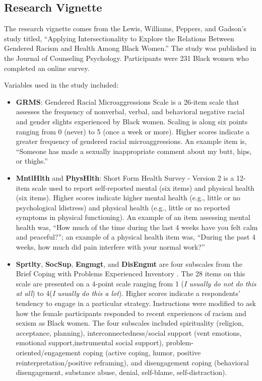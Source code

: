 \documentclass[
  11pt,
]{book}
\begin{document}
\hypertarget{research-vignette-5}{%
\subsection{Research Vignette}\label{research-vignette-5}}

The research vignette comes from the Lewis, Williams, Peppers, and Gadson's \citeyearpar{lewis_applying_2017} study titled, ``Applying Intersectionality to Explore the Relations Between Gendered Racism and Health Among Black Women.'' The study was published in the Journal of Counseling Psychology. Participants were 231 Black women who completed an online survey.

Variables used in the study included:

\begin{itemize}
\item
  \textbf{GRMS}: Gendered Racial Microaggressions Scale \citep{lewis_construction_2015} is a 26-item scale that assesses the frequency of nonverbal, verbal, and behavioral negative racial and gender slights experienced by Black women. Scaling is along six points ranging from 0 (never) to 5 (once a week or more). Higher scores indicate a greater frequency of gendered racial microaggressions. An example item is, ``Someone has made a sexually inappropriate comment about my butt, hips, or thighs.''
\item
  \textbf{MntlHlth} and \textbf{PhysHlth}: Short Form Health Survey - Version 2 \citep{ware_comparison_1995} is a 12-item scale used to report self-reported mental (six items) and physical health (six items).
  Higher scores indicate higher mental health (e.g., little or no psychological ldistress) and physical health (e.g., little or no reported symptoms in physical functioning). An example of an item assessing mental health was, ``How much of the time during the last 4 weeks have you felt calm and peaceful?''; an example of a physical health item was, ``During the past 4 weeks, how much did pain interfere with your normal work?''
\item
  \textbf{Sprtlty}, \textbf{SocSup}, \textbf{Engmgt}, and \textbf{DisEngmt} are four subscales from the Brief Coping with Problems Experienced Inventory \citep{carver_you_1997}. The 28 items on this scale are presented on a 4-point scale ranging from 1 (\emph{I usually do not do this at all}) to 4(\emph{I usually do this a lot}). Higher scores indicate a respondents' tendency to engage in a particular strategy. Instructions were modified to ask how the female participants responded to recent experiences of racism and sexism as Black women. The four subscales included spirituality (religion, acceptance, planning), interconnectedness/social support (vent emotions, emotional support,instrumental social support), problem-oriented/engagement coping (active coping, humor, positive reinterpretation/positive reframing), and disengagement coping (behavioral disengagement, substance abuse, denial, self-blame, self-distraction).

\end{itemize}
\end{document}

